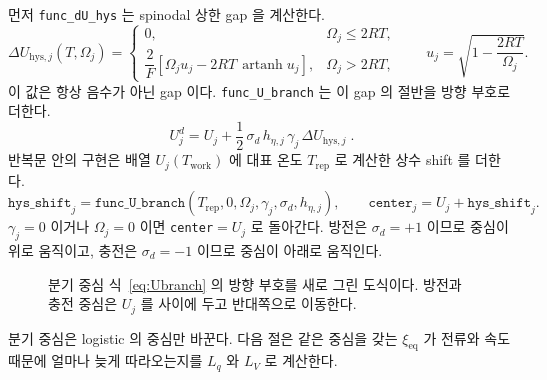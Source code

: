 \documentclass[11pt,a4paper]{article}
\newcommand{\eq}{\mathrm{eq}}
\newcommand{\hys}{\mathrm{hys}}
\newcommand{\work}{\mathrm{work}}
\newcommand{\rep}{\mathrm{rep}}
\begin{document}
먼저 \texttt{func\_dU\_hys} 는 spinodal 상한 gap 을 계산한다.
\begin{equation}
\Delta U_{\hys,j}(T,\Omega_j)=
\begin{cases}
0,&\Omega_j\le2RT,\\[3pt]
\dfrac{2}{F}\left[\Omega_j u_j-2RT\,\operatorname{artanh}u_j\right],
&\Omega_j>2RT,
\end{cases}
\qquad
u_j=\sqrt{1-\frac{2RT}{\Omega_j}}.
\label{eq:dUhys}
\end{equation}
이 값은 항상 음수가 아닌 gap 이다. \texttt{func\_U\_branch} 는 이 gap 의 절반을 방향 부호로 더한다.
\begin{equation}
\boxed{\;U_j^{d}=U_j+\frac12\,\sigma_d\,h_{\eta,j}\,\gamma_j\,\Delta U_{\hys,j}\;.}
\label{eq:Ubranch}
\end{equation}
반복문 안의 구현은 배열 $U_j(T_{\work})$ 에 대표 온도 $T_{\rep}$ 로 계산한 상수 shift 를 더한다.
\begin{equation}
\texttt{hys\_shift}_j=
\texttt{func\_U\_branch}(T_{\rep},0,\Omega_j,\gamma_j,\sigma_d,h_{\eta,j}),
\qquad
\texttt{center}_j=U_j+\texttt{hys\_shift}_j.
\label{eq:center}
\end{equation}
$\gamma_j=0$ 이거나 $\Omega_j=0$ 이면 \texttt{center}$=U_j$ 로 돌아간다. 방전은 $\sigma_d=+1$ 이므로 중심이 위로 움직이고, 충전은 $\sigma_d=-1$ 이므로 중심이 아래로 움직인다.

\begin{figure}[t]
\centering
{}
\caption{분기 중심 식~\eqref{eq:Ubranch} 의 방향 부호를 새로 그린 도식이다. 방전과 충전 중심은 $U_j$ 를 사이에 두고 반대쪽으로 이동한다.}
\label{fig:hys}
\end{figure}

분기 중심은 logistic 의 중심만 바꾼다. 다음 절은 같은 중심을 갖는 $\xi_{\eq}$ 가 전류와 속도 때문에 얼마나 늦게 따라오는지를 $L_q$ 와 $L_V$ 로 계산한다.

\end{document}
